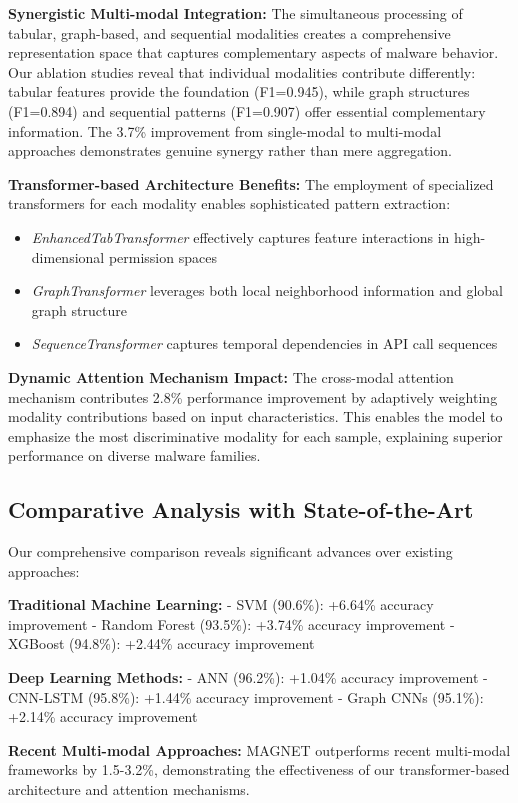 \documentclass[a4paper,11pt]{article}
\begin{document}
\textbf{Synergistic Multi-modal Integration:}
The simultaneous processing of tabular, graph-based, and sequential modalities creates a comprehensive representation space that captures complementary aspects of malware behavior. Our ablation studies reveal that individual modalities contribute differently: tabular features provide the foundation (F1=0.945), while graph structures (F1=0.894) and sequential patterns (F1=0.907) offer essential complementary information. The 3.7\% improvement from single-modal to multi-modal approaches demonstrates genuine synergy rather than mere aggregation.

\textbf{Transformer-based Architecture Benefits:}
The employment of specialized transformers for each modality enables sophisticated pattern extraction:
\begin{itemize}
    \item \textit{EnhancedTabTransformer} effectively captures feature interactions in high-dimensional permission spaces
    \item \textit{GraphTransformer} leverages both local neighborhood information and global graph structure
    \item \textit{SequenceTransformer} captures temporal dependencies in API call sequences
\end{itemize}

\textbf{Dynamic Attention Mechanism Impact:}
The cross-modal attention mechanism contributes 2.8\% performance improvement by adaptively weighting modality contributions based on input characteristics. This enables the model to emphasize the most discriminative modality for each sample, explaining superior performance on diverse malware families.

\subsection{Comparative Analysis with State-of-the-Art}
Our comprehensive comparison reveals significant advances over existing approaches:

\textbf{Traditional Machine Learning:}
- SVM (90.6\%): +6.64\% accuracy improvement
- Random Forest (93.5\%): +3.74\% accuracy improvement
- XGBoost (94.8\%): +2.44\% accuracy improvement

\textbf{Deep Learning Methods:}
- ANN (96.2\%): +1.04\% accuracy improvement
- CNN-LSTM (95.8\%): +1.44\% accuracy improvement
- Graph CNNs (95.1\%): +2.14\% accuracy improvement

\textbf{Recent Multi-modal Approaches:}
MAGNET outperforms recent multi-modal frameworks by 1.5-3.2\%, demonstrating the effectiveness of our transformer-based architecture and attention mechanisms.
\end{document}
